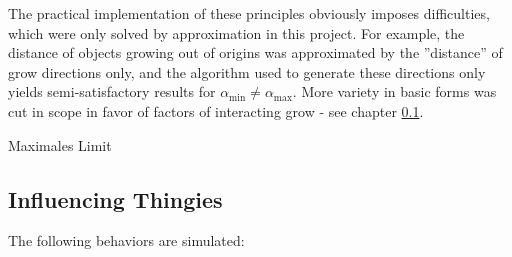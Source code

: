 \documentclass[11pt]{scrartcl}
\begin{document}
The practical implementation of these principles obviously imposes difficulties, which were only solved by approximation in this project. For example, the distance of objects growing out of origins was approximated by the ''distance'' of grow directions only, and the algorithm used to generate these directions only yields semi-satisfactory results for $\alpha_\text{min} \neq \alpha_\text{max}$. More variety in basic forms was cut in scope in favor of factors of interacting grow - see chapter \ref{cptr:Influencing}.

Maximales Limit

\subsection{Influencing Thingies} \label{cptr:Influencing}
The following behaviors are simulated:
\end{document}
